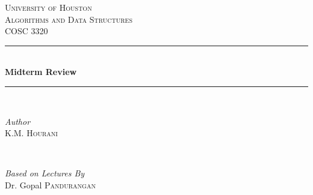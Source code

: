 \begin{titlepage} %
    \newcommand{\HRule}{\rule{\linewidth}{0.5mm}} %

    \centering %


    \textsc{\LARGE University of Houston}\\[1.5cm] %

    \textsc{\Large Algorithms and Data Structures}\\[0.5cm] %

    \textsc{\large COSC 3320}\\[0.5cm] %


    \HRule\\[0.4cm]

    {\huge\bfseries Midterm Review}\\[0.4cm] %

    \HRule\\[1.5cm]


    \begin{minipage}{0.4\textwidth}
        \begin{flushleft}
            \large
            \textit{Author}\\
            K.M. \textsc{Hourani} %
        \end{flushleft}
    \end{minipage}
    ~
    \begin{minipage}{0.4\textwidth}
        \begin{flushright}
            \large
            \textit{Based on Lectures By}\\
            Dr. Gopal \textsc{Pandurangan} %
        \end{flushright}
    \end{minipage}


\end{titlepage}
